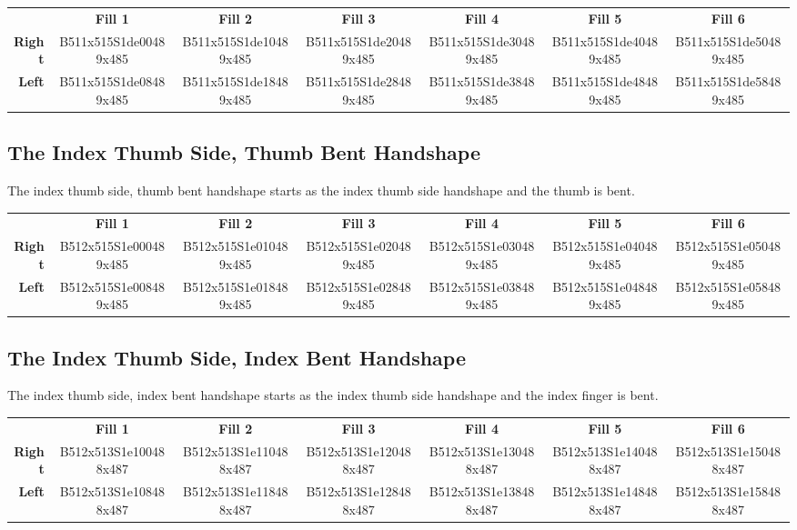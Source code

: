 \documentclass{article}
\begin{document}
\begin{center}
\begin{tabular}{r*{6}{c}}
&\textbf{Fill 1}&\textbf{Fill 2}&\textbf{Fill 3}&\textbf{Fill 4}&\textbf{Fill 5}&\textbf{Fill 6}\\
\textbf{Right}&
B511x515S1de00489x485&
B511x515S1de10489x485&
B511x515S1de20489x485&
B511x515S1de30489x485&
B511x515S1de40489x485&
B511x515S1de50489x485\\
\textbf{Left}&
B511x515S1de08489x485&
B511x515S1de18489x485&
B511x515S1de28489x485&
B511x515S1de38489x485&
B511x515S1de48489x485&
B511x515S1de58489x485\\
\end{tabular}
\end{center}

\subsection{The Index Thumb Side, Thumb Bent Handshape}

The index thumb side, thumb bent handshape starts as the index thumb side handshape and the thumb is bent.

\begin{center}
\begin{tabular}{r*{6}{c}}
&\textbf{Fill 1}&\textbf{Fill 2}&\textbf{Fill 3}&\textbf{Fill 4}&\textbf{Fill 5}&\textbf{Fill 6}\\
\textbf{Right}&
B512x515S1e000489x485&
B512x515S1e010489x485&
B512x515S1e020489x485&
B512x515S1e030489x485&
B512x515S1e040489x485&
B512x515S1e050489x485\\
\textbf{Left}&
B512x515S1e008489x485&
B512x515S1e018489x485&
B512x515S1e028489x485&
B512x515S1e038489x485&
B512x515S1e048489x485&
B512x515S1e058489x485\\
\end{tabular}
\end{center}

\subsection{The Index Thumb Side, Index Bent Handshape}

The index thumb side, index bent handshape starts as the index thumb side handshape and the index finger is bent.

\begin{center}
\begin{tabular}{r*{6}{c}}
&\textbf{Fill 1}&\textbf{Fill 2}&\textbf{Fill 3}&\textbf{Fill 4}&\textbf{Fill 5}&\textbf{Fill 6}\\
\textbf{Right}&
B512x513S1e100488x487&
B512x513S1e110488x487&
B512x513S1e120488x487&
B512x513S1e130488x487&
B512x513S1e140488x487&
B512x513S1e150488x487\\
\textbf{Left}&
B512x513S1e108488x487&
B512x513S1e118488x487&
B512x513S1e128488x487&
B512x513S1e138488x487&
B512x513S1e148488x487&
B512x513S1e158488x487\\
\end{tabular}
\end{center}
\end{document}
